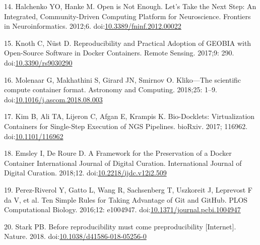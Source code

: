 \documentclass[10pt,letterpaper]{article}
\begin{document}
\leavevmode\hypertarget{ref-halchenko_open_2012}{}%
14. Halchenko YO, Hanke M. Open is Not Enough. Let's Take the Next Step:
An Integrated, Community-Driven Computing Platform for Neuroscience.
Frontiers in Neuroinformatics. 2012;6.
doi:\href{https://doi.org/10.3389/fninf.2012.00022}{10.3389/fninf.2012.00022}

\leavevmode\hypertarget{ref-knoth_reproducibility_2017}{}%
15. Knoth C, Nüst D. Reproducibility and Practical Adoption of GEOBIA
with Open-Source Software in Docker Containers. Remote Sensing. 2017;9:
290. doi:\href{https://doi.org/10.3390/rs9030290}{10.3390/rs9030290}

\leavevmode\hypertarget{ref-molenaar_klikoscientific_2018}{}%
16. Molenaar G, Makhathini S, Girard JN, Smirnov O. Kliko---The
scientific compute container format. Astronomy and Computing. 2018;25:
1--9.
doi:\href{https://doi.org/10.1016/j.ascom.2018.08.003}{10.1016/j.ascom.2018.08.003}

\leavevmode\hypertarget{ref-kim_bio-docklets_2017}{}%
17. Kim B, Ali TA, Lijeron C, Afgan E, Krampis K. Bio-Docklets:
Virtualization Containers for Single-Step Execution of NGS Pipelines.
bioRxiv. 2017; 116962.
doi:\href{https://doi.org/10.1101/116962}{10.1101/116962}

\leavevmode\hypertarget{ref-emsley_framework_2018}{}%
18. Emsley I, De Roure D. A Framework for the Preservation of a Docker
Container International Journal of Digital Curation. International
Journal of Digital Curation. 2018;12.
doi:\href{https://doi.org/10.2218/ijdc.v12i2.509}{10.2218/ijdc.v12i2.509}

\leavevmode\hypertarget{ref-perez-riverol_ten_2016}{}%
19. Perez-Riverol Y, Gatto L, Wang R, Sachsenberg T, Uszkoreit J,
Leprevost F da V, et al. Ten Simple Rules for Taking Advantage of Git
and GitHub. PLOS Computational Biology. 2016;12: e1004947.
doi:\href{https://doi.org/10.1371/journal.pcbi.1004947}{10.1371/journal.pcbi.1004947}

\leavevmode\hypertarget{ref-stark_before_2018}{}%
20. Stark PB. Before reproducibility must come preproducibility
{[}Internet{]}. Nature. 2018.
doi:\href{https://doi.org/10.1038/d41586-018-05256-0}{10.1038/d41586-018-05256-0}

\nolinenumbers
\end{document}

